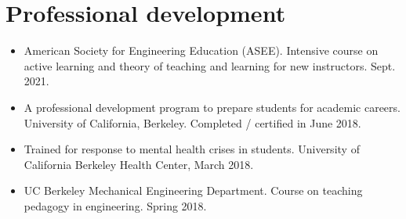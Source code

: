 \documentclass[letterpaper]{deedy-resume} %
\begin{document}
{%



  
  



\vspace{0.2cm}
\section{Professional development}
\vspace{0.2cm}

\begin{itemize}

\item {} American Society for Engineering Education (ASEE). Intensive course on active learning and theory of teaching and learning for new instructors. Sept. 2021.

\item {} A professional development program to prepare students for academic careers. University of California, Berkeley. Completed / certified in June 2018.
  
\item {} Trained for response to mental health crises in students. University of California Berkeley Health Center, March 2018.

\item {} UC Berkeley Mechanical Engineering Department. Course on teaching pedagogy in engineering. Spring 2018.
  

\end{itemize}}
\end{document}

